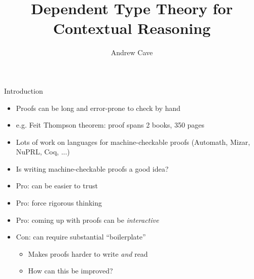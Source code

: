 \documentclass[usenames,dvipsnames]{beamer}
\author{Andrew Cave}
\title[{\makebox[.45\paperwidth]{Dependent Type Theory for Contextual Reasoning\hfill%
       \insertframenumber/\inserttotalframenumber}}]{Dependent Type Theory for Contextual Reasoning}
\begin{document}
\begin{frame}
\titlepage
\end{frame}

\begin{frame}{Introduction}
\begin{itemize}
\item Proofs can be long and error-prone to check by hand
\pause \item e.g. Feit Thompson theorem: proof spans 2 books, 350 pages
\pause \item Lots of work on languages for machine-checkable proofs (Automath, Mizar, NuPRL, Coq, ...)
\pause \item Is writing machine-checkable proofs a good idea?
\pause \item {\color{green} Pro:} can be easier to trust
\pause \item {\color{green} Pro:} force rigorous thinking
\pause \item {\color{green} Pro:} coming up with proofs can be \emph{interactive}
\pause \item {\color{red} Con:} can require substantial ``boilerplate''
\begin{itemize}
\item Makes proofs harder to write \emph{and} read
\item How can this be improved?
\end{itemize}
\end{itemize}
\end{frame}
\end{document}

